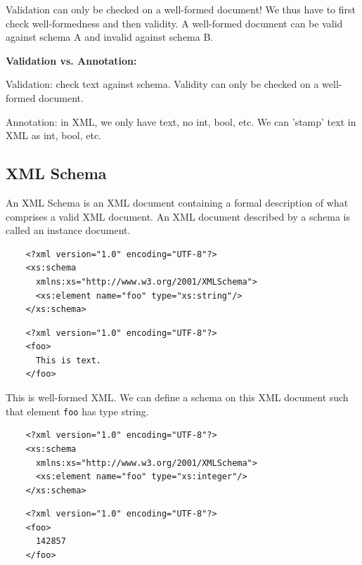 \documentclass[11pt,oneside,a4paper]{article}
\begin{document}
Validation can only be checked on a well-formed document! We thus have to first check well-formedness and then validity. A well-formed document can be valid against schema A and invalid against schema B.

\textbf{Validation vs. Annotation:}

\begin{compactitem}
	\item Validation: check text against schema. Validity can only be checked on a well-formed document.
	\item Annotation: in XML, we only have text, no int, bool, etc. We can 'stamp' text in XML as int, bool, etc.	
\end{compactitem}


\subsection{XML Schema}

An XML Schema is an XML document containing a formal description of what comprises a valid XML document. An XML document described by a schema is called an instance document.

\begin{multicols}{2}
	\begin{verbatim}
	<?xml version="1.0" encoding="UTF-8"?>
	<xs:schema
	  xmlns:xs="http://www.w3.org/2001/XMLSchema">
	  <xs:element name="foo" type="xs:string"/>
	</xs:schema>
	\end{verbatim}
	
	\begin{verbatim}
	<?xml version="1.0" encoding="UTF-8"?>
	<foo>
	  This is text.
	</foo>
	\end{verbatim}
\end{multicols}

This is well-formed XML. We can define a schema on this XML document such that element \verb|foo| has type string.

\begin{multicols}{2}
	\begin{verbatim}
	<?xml version="1.0" encoding="UTF-8"?>
	<xs:schema
	  xmlns:xs="http://www.w3.org/2001/XMLSchema">
	  <xs:element name="foo" type="xs:integer"/>
	</xs:schema>
	\end{verbatim}
	
	\begin{verbatim}
	<?xml version="1.0" encoding="UTF-8"?>
	<foo>
	  142857
	</foo>
	\end{verbatim}
\end{multicols}
\end{document}
